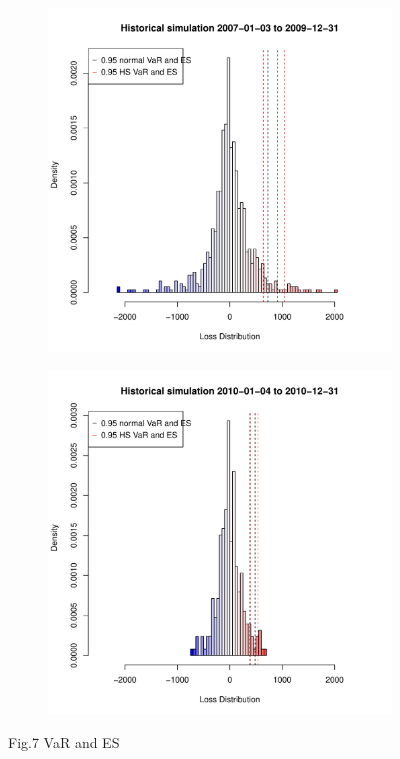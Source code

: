 \documentclass[11pt]{article}
\begin{document}
\begin{figure}[h]
\begin{subfigure}{0.5\textwidth}
  \centering
  \includegraphics[width=1\linewidth]{graph/HistoricalSimulation200709sq.pdf}
\end{subfigure}%
\begin{subfigure}{0.5\textwidth}
  \centering
  \includegraphics[width=1\linewidth]{graph/HistoricalSimulation2010sq.pdf}\\
\end{subfigure}
\centering Fig.7 VaR and ES
\end{figure}
\end{document}
